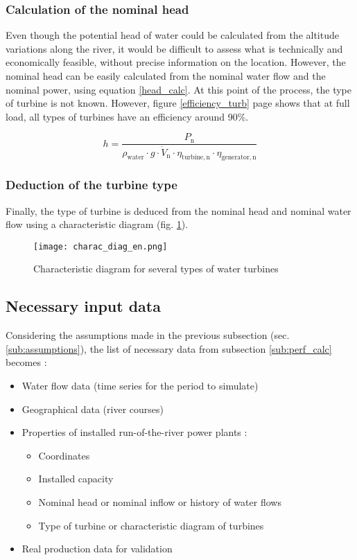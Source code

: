 \subsubsection{Calculation of the nominal head}
\label{sub:extrapol_h_n}

Even though the potential head of water could be calculated from the altitude variations along the river, it would be difficult to assess what is technically and economically feasible, without precise information on the location. However, the nominal head can be easily calculated from the nominal water flow and the nominal power, using equation \ref{head_calc}. At this point of the process, the type of turbine is not known. However, figure \ref{efficiency_turb} page \pageref{efficiency_turb} shows that at full load, all types of turbines have an efficiency around 90\%.

\begin{equation}
\label{head_calc} 
 h = \frac{P_\mathrm{n}}{\rho_\mathrm{water} \cdot g \cdot \dot{V}_\mathrm{n} \cdot \eta_\mathrm{turbine,n} \cdot \eta_\mathrm{generator,n}}
\end{equation}

\subsubsection{Deduction of the turbine type}
Finally, the type of turbine is deduced from the nominal head and nominal water flow using a characteristic diagram (fig. \ref{charac_diag}). 

\begin{figure}[H]
\centering
\texttt{[image: charac\_diag\_en.png]}
\caption[Characteristic diagram for several types of water turbines]{Characteristic diagram for several types of water turbines \cite{wiki_WK}}
\label{charac_diag}
\end{figure}

\subsection{Necessary input data}
\label{sub:collec_data}

Considering the assumptions made in the previous subsection (sec. \ref{sub:assumptions}), the list of necessary data from subsection \ref{sub:perf_calc} becomes :
\begin{itemize}
 \item Water flow data (time series for the period to simulate)
 \item Geographical data (river courses)
 \item Properties of installed run-of-the-river power plants :
 \begin{itemize}
  \item Coordinates
  \item Installed capacity
  \item Nominal head or nominal inflow or history of water flows
  \item Type of turbine or characteristic diagram of turbines
 \end{itemize}
 \item Real production data for validation
\end{itemize}

